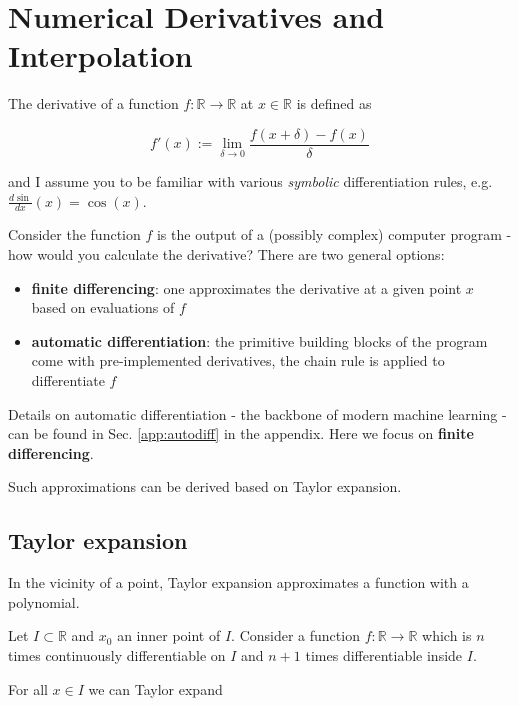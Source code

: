 \section{Numerical Derivatives and Interpolation}
\thispagestyle{plain}

The derivative of a function $f: \mathbb{R} \to \mathbb{R}$
at $x \in \mathbb{R}$ is defined as

\begin{equation}
    f'(x) := \lim_{\delta \to 0} \frac{f(x+\delta)-f(x)}{\delta}
\end{equation}

and I assume you to be familiar with various \textit{symbolic} differentiation
rules, e.g. $\frac{d\sin}{dx}(x) = \cos(x)$.

Consider the function $f$ is the output of a (possibly complex) computer program - how
would you calculate the derivative? There are two general options:

\begin{itemize}
    \item \textbf{finite differencing}: one approximates the derivative at a given point $x$ based on evaluations of $f$
    \item \textbf{automatic differentiation}: the primitive building blocks of the program come with pre-implemented derivatives,
    the chain rule is applied to differentiate $f$
\end{itemize}

Details on automatic differentiation - the backbone of modern machine 
learning - can be found in Sec. \ref{app:autodiff} in the appendix.
Here we focus on \textbf{finite differencing}.


Such approximations can be derived based on Taylor expansion.

\subsection{Taylor expansion}

In the vicinity of a point, Taylor expansion approximates a function with a polynomial.

Let $I \subset \mathbb{R}$ and $x_0$ an inner point of $I$. Consider a function $f: \mathbb{R} \to \mathbb{R}$
which is $n$ times continuously differentiable on $I$ and $n+1$ times differentiable inside $I$.

For all $x \in I$ we can Taylor expand

